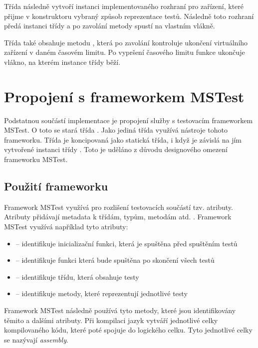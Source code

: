 Třída následně vytvoří instanci implementovaného rozhraní pro zařízení, které přijme v konstruktoru vybraný způsob reprezentace testů. Následně toto rozhraní předá instanci třídy  a po zavolání metody  spustí  na vlastním vlákně.

Třída také obsahuje metodu , která po zavolání kontroluje ukončení virtuálního zařízení v daném časovém limitu. Po vypršení časového limitu funkce ukončuje vlákno, na kterém instance třídy  běží.


\section{Propojení s frameworkem MSTest }

Podstatnou součástí implementace je propojení služby s testovacím frameworkem MSTest. O toto se stará třída . Jako jediná třída využívá nástroje tohoto frameworku. Třída je koncipovaná jako statická třída, i když je závislá na jím vytvořené instanci třídy . Toto je uděláno z důvodu designového omezení frameworku MSTest. 


\subsection{Použití frameworku}
Framework MSTest využívá pro rozlišení testovacích součástí tzv. atributy. Atributy přidávají metadata k třídám, typům, metodám atd. \cite{attribute_docs}. Framework MSTest využívá například tyto atributy:

\begin{itemize}
    \item {} -- identifikuje inicializační funkci, která je spuštěna před spuštěním testů \cite{attr_init_clean}
    \item {} -- identifikuje funkci která bude spuštěna po skončení všech testů \cite{attr_init_clean}
    \item {} -- identifikuje třídu, která obsahuje testy \cite{mstest_docs}
    \item {} -- identifikuje metody, které reprezentují jednotlivé  testy \cite{mstest_docs}
\end{itemize}

Framework MSTest následně používá tyto metody, které jsou identifikovány těmito a dalšími atributy. Při kompilaci jazyk  vytváří jednotlivé celky kompilovaného kódu, které poté spojuje do logického celku. Tyto jednotlivé celky se nazývají \textit{assembly}. \cite{assembly}

